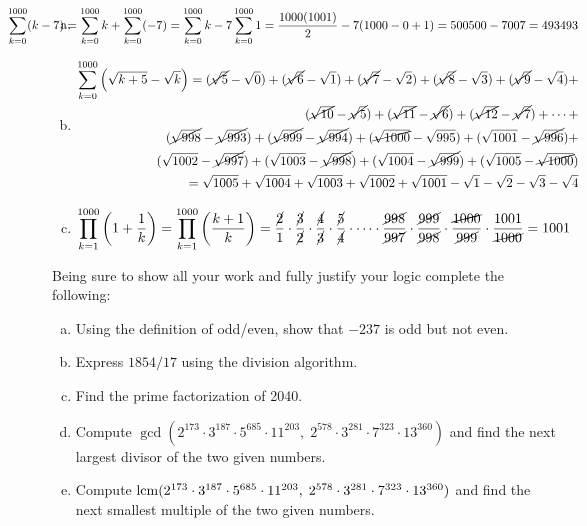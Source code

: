 \documentclass[12pt,letterpaper]{exam}
\begin{document}
\begin{questions}
{\begin{enumerate}[(a)]
\item 
	\[
	\hspace{-2cm} \sum_{k=0}^{1000} (k - 7)= \sum_{k=0}^{1000} k + \sum_{k=0}^{1000} (-7)= \sum_{k=0}^{1000} k - 7 \sum_{k=0}^{1000} 1= \dfrac{1000(1001)}{2} - 7(1000 - 0 + 1)= 500500 - 7007= 493493
	\] 

\item 
	\[
	\begin{aligned}
	\sum_{k=0}^{1000} \left( \sqrt{k + 5} - \sqrt{k} \right)= ( \cancel{\sqrt{5}} - \sqrt{0} ) + ( \cancel{\sqrt{6}} - \sqrt{1} ) + ( \cancel{\sqrt{7}} - \sqrt{2} ) + ( \cancel{\sqrt{8}} - \sqrt{3} ) + ( \cancel{\sqrt{9}} - \sqrt{4} ) + \\
	( \cancel{\sqrt{10}} - \cancel{\sqrt{5}} ) + ( \cancel{\sqrt{11}} - \cancel{\sqrt{6}} ) + ( \cancel{\sqrt{12}} - \cancel{\sqrt{7}} ) + \cdots + \\
	( \cancel{\sqrt{998}} - \cancel{\sqrt{993}} ) + ( \cancel{\sqrt{999}} - \cancel{\sqrt{994}} ) + ( \cancel{\sqrt{1000}} - \sqrt{995} ) + ( \sqrt{1001} - \cancel{\sqrt{996}} ) +   \\
	( \sqrt{1002} - \cancel{\sqrt{997}} ) + ( \sqrt{1003} - \cancel{\sqrt{998}} ) + ( \sqrt{1004} - \cancel{\sqrt{999}} ) + ( \sqrt{1005} - \cancel{\sqrt{1000}} ) \\
	= \sqrt{1005} + \sqrt{1004} + \sqrt{1003} + \sqrt{1002} + \sqrt{1001} - \sqrt{1} - \sqrt{2} - \sqrt{3} - \sqrt{4}
	\end{aligned}
	\] 

\item 
	\[
	\prod_{k=1}^{1000} \left(1 + \dfrac{1}{k} \right)= \prod_{k=1}^{1000} \left(\dfrac{k + 1}{k} \right)= \dfrac{\cancel{2}}{1} \cdot \dfrac{\cancel{3}}{\cancel{2}} \cdot \dfrac{\cancel{4}}{\cancel{3}} \cdot \dfrac{\cancel{5}}{\cancel{4}} \cdot \cdots \cdot \dfrac{\cancel{998}}{\cancel{997}} \cdot \dfrac{\cancel{999}}{\cancel{998}} \cdot \dfrac{\cancel{1000}}{\cancel{999}} \cdot \dfrac{1001}{\cancel{1000}}= 1001
	\]
\end{enumerate}
}



\newpage
\question[10] Being sure to show all your work and fully justify your logic complete the following:
	\begin{enumerate}[(a)]
	\item Using the definition of odd/even, show that $-237$ is odd but not even.
	\item Express $1854/17$ using the division algorithm. 
	\item Find the prime factorization of 2040. 
	\item Compute $\gcd(2^{173} \cdot 3^{187} \cdot 5^{685} \cdot 11^{203}, \; 2^{578} \cdot 3^{281} \cdot 7^{323} \cdot 13^{360})$ and find the next largest divisor of the two given numbers. 
	\item Compute $\operatorname{lcm}(2^{173} \cdot 3^{187} \cdot 5^{685} \cdot 11^{203}, \; 2^{578} \cdot 3^{281} \cdot 7^{323} \cdot 13^{360})$ and find the next smallest multiple of the two given numbers.
	\end{enumerate} \pspace


\end{questions}
\end{document}
